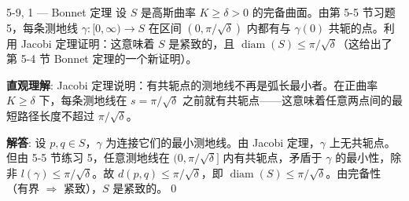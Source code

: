 \begin{exercise}{5-9, 1 — Bonnet 定理}
设 $S$ 是高斯曲率 $K \geq \delta > 0$ 的完备曲面。由第 5-5 节习题 5，每条测地线 $\gamma: [0, \infty) \to S$ 在区间 $(0, \pi/\sqrt{\delta})$ 内都有与 $\gamma(0)$ 共轭的点。利用 Jacobi 定理证明：这意味着 $S$ 是紧致的，且 $\operatorname{diam}(S) \leq \pi/\sqrt{\delta}$（这给出了第 5-4 节 Bonnet 定理的一个新证明）。
\end{exercise}
\begin{solution}
\textbf{直观理解}: Jacobi 定理说明：有共轭点的测地线不再是弧长最小者。在正曲率 $K\geq\delta$ 下，每条测地线在 $s=\pi/\sqrt{\delta}$ 之前就有共轭点——这意味着任意两点间的最短路径长度不超过 $\pi/\sqrt{\delta}$。

\textbf{解答}: 设 $p,q\in S$，$\gamma$ 为连接它们的最小测地线。由 Jacobi 定理，$\gamma$ 上无共轭点。但由 5-5 节练习 5，任意测地线在 $(0,\pi/\sqrt{\delta}]$ 内有共轭点，矛盾于 $\gamma$ 的最小性，除非 $l(\gamma)\leq\pi/\sqrt{\delta}$。故 $d(p,q)\leq\pi/\sqrt{\delta}$，即 $\operatorname{diam}(S)\leq\pi/\sqrt{\delta}$。由完备性（有界 $\Rightarrow$ 紧致），$S$ 是紧致的。\qed
\end{solution}

